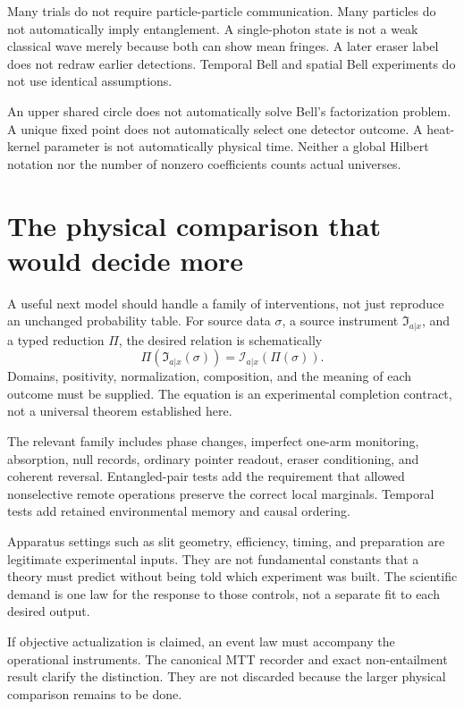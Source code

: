 \documentclass[11pt,a4paper]{article}
\begin{document}
Many trials do not require particle-particle communication. Many particles do not automatically imply entanglement. A single-photon state is not a weak classical wave merely because both can show mean fringes. A later eraser label does not redraw earlier detections. Temporal Bell and spatial Bell experiments do not use identical assumptions.

An upper shared circle does not automatically solve Bell's factorization problem. A unique fixed point does not automatically select one detector outcome. A heat-kernel parameter is not automatically physical time. Neither a global Hilbert notation nor the number of nonzero coefficients counts actual universes.

\section{The physical comparison that would decide more}
\label{sec:frontier}
A useful next model should handle a family of interventions, not just reproduce an unchanged probability table. For source data \(\sigma\), a source instrument \(\mathfrak I_{a|x}\), and a typed reduction \(\Pi\), the desired relation is schematically
\begin{equation}
\Pi\!\left(\mathfrak I_{a|x}(\sigma)\right)
 =\mathcal I_{a|x}\!\left(\Pi(\sigma)\right).
\end{equation}
Domains, positivity, normalization, composition, and the meaning of each outcome must be supplied. The equation is an experimental completion contract, not a universal theorem established here.

The relevant family includes phase changes, imperfect one-arm monitoring, absorption, null records, ordinary pointer readout, eraser conditioning, and coherent reversal. Entangled-pair tests add the requirement that allowed nonselective remote operations preserve the correct local marginals. Temporal tests add retained environmental memory and causal ordering.

Apparatus settings such as slit geometry, efficiency, timing, and preparation are legitimate experimental inputs. They are not fundamental constants that a theory must predict without being told which experiment was built. The scientific demand is one law for the response to those controls, not a separate fit to each desired output.

If objective actualization is claimed, an event law must accompany the operational instruments. The canonical MTT recorder and exact non-entailment result clarify the distinction. They are not discarded because the larger physical comparison remains to be done.
\end{document}
